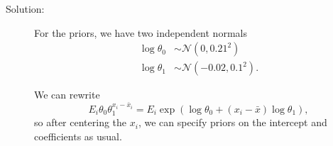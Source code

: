\documentclass[letterpaper,11pt]{article}
\begin{document}
\begin{enumerate}
\begin{enumerate}
    \begin{description}
    \item[Solution:] For the priors, we have two independent normals
      \begin{align*}
        \log\theta_0
        &\sim \mathcal{N}\left(0, 0.21^2\right) \\
        \log\theta_1
        &\sim \mathcal{N}\left(-0.02, 0.1^2\right).
      \end{align*}

      We can rewrite
      \begin{equation}
        E_i\theta_0\theta_1^{x_i - \bar{x}_i} = E_i\exp\left(
          \log\theta_0 + \left(x_i - \bar{x}\right)\log\theta_1
        \right),
      \end{equation}
      so after centering the $x_i$, we can specify priors on the intercept and
      coefficients as usual.
    \end{description}
  \end{enumerate}
  
\end{enumerate}
\end{document}
